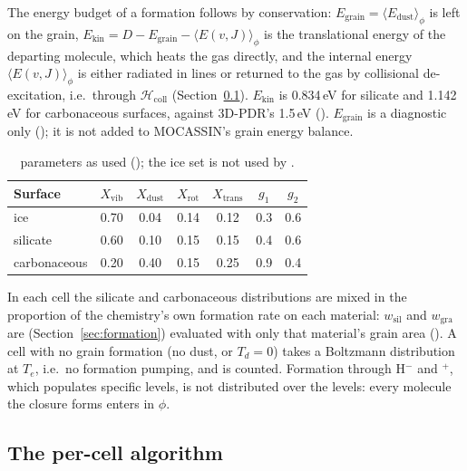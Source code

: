 The energy budget of a formation follows by conservation: $E_{\mathrm{grain}}=\langle
E_{\mathrm{dust}}\rangle_\phi$ is left on the grain,
$E_{\mathrm{kin}}=D-E_{\mathrm{grain}}-\langle E(v,J)\rangle_\phi$ is the translational energy
of the departing molecule, which heats the gas directly, and the internal
energy $\langle E(v,J)\rangle_\phi$ is either radiated in \Htwo{} lines or returned to
the gas by collisional de-excitation, i.e.\ through
$\mathcal{H}_{\mathrm{coll}}$ (Section~\ref{sec:solvecell}). $E_{\mathrm{kin}}$ is 0.834\,eV for
silicate and 1.142\,eV for carbonaceous surfaces, against 3D-PDR's 1.5\,eV
(). $E_{\mathrm{grain}}$ is a diagnostic only (); it is not
added to MOCASSIN's grain energy balance.

\begin{table}[H]
\centering
\caption{\citet[their Table~2]{TakahashiUehara2001} parameters as used
(); the ice set is not used by .}\label{tab:tu01}
\begin{tabular}{@{}lcccccc@{}}
\toprule
Surface & $X_{\mathrm{vib}}$ & $X_{\mathrm{dust}}$ & $X_{\mathrm{rot}}$ & $X_{\mathrm{trans}}$ & $g_1$ & $g_2$ \\
\midrule
ice & 0.70 & 0.04 & 0.14 & 0.12 & 0.3 & 0.6 \\
silicate & 0.60 & 0.10 & 0.15 & 0.15 & 0.4 & 0.6 \\
carbonaceous & 0.20 & 0.40 & 0.15 & 0.25 & 0.9 & 0.4 \\
\bottomrule
\end{tabular}
\end{table}

In each cell the silicate and carbonaceous distributions are mixed in the
proportion of the chemistry's own formation rate on each material:
$w_{\mathrm{sil}}$ and $w_{\mathrm{gra}}$ are 
(Section~\ref{sec:formation}) evaluated with only that material's grain area
(). A cell with no grain formation (no dust,
or $T_d=0$) takes a Boltzmann distribution at $T_e$, i.e.\ no formation pumping,
and is counted. Formation through H$^-$ and \Htwo$^+$, which populates specific
levels, is not distributed over the levels: every molecule the closure forms
enters in $\phi$.

\subsection{The per-cell algorithm}
\label{sec:solvecell}

